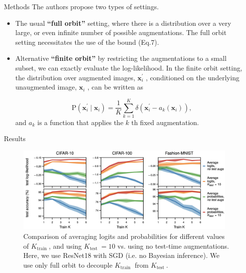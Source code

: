 \documentclass[10pt, handout, envcountsect]{beamer} %
\begin{document}
\begin{frame}{Methods}
The authors propose two types of settings.

\vspace{10pt}

\begin{itemize}
\item The usual \textbf{“full orbit”} setting,
where there is a distribution over a very large, or even infinite number of possible augmentations.
The full orbit setting
necessitates the use of the bound (Eq.7).

\vspace{10pt}

\item Alternative \textbf{“finite orbit”} by restricting the augmentations to
a small subset, we can exactly evaluate the log-likelihood. In the finite orbit setting, the distribution over augmented
images, $\mathbf{x}_{i}^{\prime}$
, conditioned on the underlying unaugmented image, $\mathbf{x}_{i}$
, can be written as

\begin{equation*}
\mathrm{P}\left(\mathbf{x}_{i}^{\prime} \mid \mathbf{x}_{i}\right)=\frac{1}{K} \sum_{k=1}^{K} \delta\left(\mathbf{x}_{i}^{\prime}-a_{k}\left(\mathbf{x}_{i}\right)\right), \tag{10}
\end{equation*}
and $a_{k}$ is a function that applies the $k$ th fixed augmentation.
\end{itemize}
\end{frame}

\begin{frame}{Results }
\begin{figure}[h]
    \centering
    \includegraphics[width=11cm,]{figure2.png}
    \caption{Comparison of averaging logits and probabilities for different values of $K_{\text {train }}$, and using $K_{\text {test }}=10$ vs. using no test-time augmentations. Here, we use ResNet18 with SGD (i.e. no Bayesian inference). We use only full orbit to decouple $K_{\text {train }}$ from $K_{\text {test }}$.}
\end{figure}
\end{frame}
\end{document}
